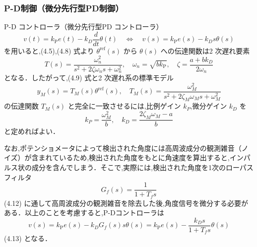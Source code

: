\subsubsection{P-D制御（微分先行型PD制御）}
P-D コントローラ（微分先行型PD コントローラ）
\begin{equation}
  v(t) = k_{\mathrm{P}} e(t) - k_D \frac{d}{dt} \theta(t) \quad \Longleftrightarrow \quad v(s) = k_{\mathrm{P}} e(s) - k_D s \theta(s)
\end{equation}
を用いると,(4.5),(4.8) 式より $\theta^{\text{ref}}(s)$ から $\theta(s)$ への伝達関数は2 次遅れ要素
\begin{equation}
  T(s) = \frac{\omega_n^2}{s^2 + 2 \zeta \omega_n s + \omega_n^2}, \quad \omega_n = \sqrt{b k_{\mathrm{P}}}, \quad \zeta = \frac{a + b k_D}{2 \omega_n}
\end{equation}
となる．したがって,(4.9) 式と2 次遅れ系の標準モデル
\begin{equation}
  y_M(s) = T_M(s) \theta^{\text{ref}}(s), \quad T_M(s) = \frac{\omega_M^2}{s^2 + 2 \zeta_M \omega_M s + \omega_M^2}
\end{equation}
の伝達関数 $T_M(s)$ と完全に一致させるには,比例ゲイン $k_P$,微分ゲイン $k_D$ を
\begin{equation}
  k_P = \frac{\omega_M^2}{b}, \quad k_D = \frac{2 \zeta_M \omega_M - a}{b}
\end{equation}
と定めればよい．

なお,ポテンショメータによって検出された角度には高周波成分の観測雑音（ノイズ）が含まれているため,検出された角度をもとに角速度を算出すると,インパルス状の成分を含んでしまう．そこで,実際には,検出された角度を1次のローパスフィルタ
\begin{equation}
  G_f(s) = \frac{1}{1 + T_f s}
\end{equation}
(4.12)
に通して高周波成分の観測雑音を除去した後,角度信号を微分する必要がある．以上のことを考慮すると,P-Dコントローラは
\begin{equation}
  v(s) = k_{\mathrm{P}} e(s) - k_D G_f(s) s \theta(s) = k_{\mathrm{P}} e(s) - \frac{k_D s}{1 + T_f s} \theta(s)
\end{equation}
(4.13)
となる．

